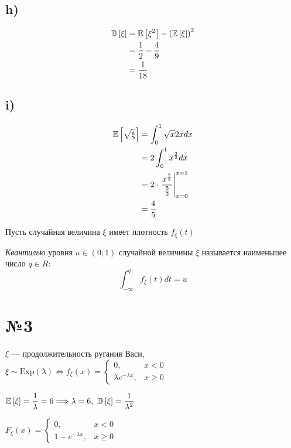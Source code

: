 \documentclass[a4paper, 10pt]{article}
\begin{document}
\subsection*{h)}
\begin{equation*}
    \begin{aligned}
        \mathbb{D}\left[\xi\right]&=\mathbb{E}\left[\xi^2\right]-\left(\mathbb{E}\left[\xi\right]\right)^2\\
        &=\frac{1}{2}-\frac{4}{9}\\
        &=\frac{1}{18}
    \end{aligned}
\end{equation*}
\subsection*{i)}
\begin{equation*}
    \begin{aligned}
        \mathbb{E}\left[\sqrt{\xi}\right]&=\int_{0}^1 \sqrt{x}2xdx\\
        &=2\int_0^1x^{\frac{3}{2}}dx\\
        &=2\cdot\left.\frac{x^{\frac{5}{2}}}{\frac{5}{2}}\right\vert_{x=0}^{x=1}\\
        &=\frac{4}{5}
    \end{aligned}
\end{equation*}

 Пусть случайная величина $\xi$ имеет плотность $f_{\xi}(t)$

\textit{Квантилью} уровня $u\in(0;1)$ случайной величины $\xi$ называется наименьшее число $q\in\mathbb{}R$:
\begin{equation*}
    \int_{-\infty}^q f_{\xi}(t)dt=u
\end{equation*}

\section*{№3}
$\xi$ — продолжительность ругания Васи, $\xi\sim\text{Exp}(\lambda)\Longleftrightarrow f_{\xi}(x)=\begin{cases}
    0,&x <0\\
    \lambda e^{-\lambda x},&x\geqslant 0
\end{cases}$

$\matwait{\xi}=\displaystyle\frac{1}{\lambda}=6\Longrightarrow\lambda=6,\ \dispersia{\xi}=\frac{1}{\lambda^2}$

$F_{\xi}(x)=\begin{cases}
    0,&x<0\\
    1-e^{-\lambda x},&x\geqslant0
\end{cases}$
\end{document}
